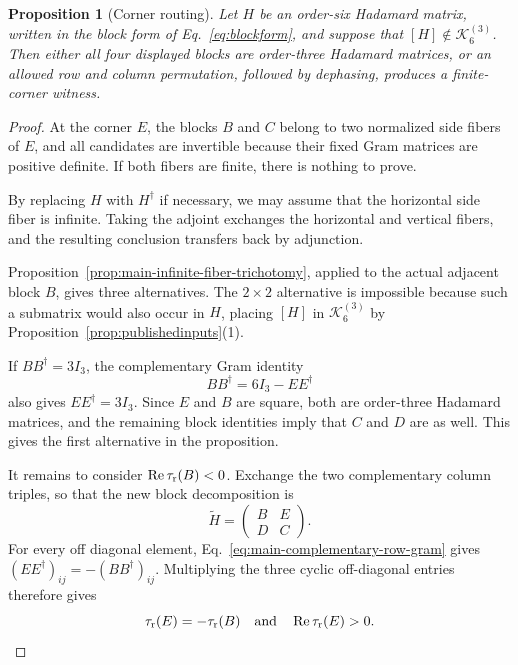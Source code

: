 \documentclass[aps,prx,reprint,nofootinbib,twoside,superscriptaddress,longbibliography,floatfix]{revtex4-2}
\newtheorem{proposition}[theorem]{Proposition}
\theoremstyle{definition}
\newcommand{\KK}{\mathcal K}
\newcommand{\RePart}{\operatorname{Re}}
\begin{document}
\begin{proposition}[Corner routing]
\label{prop:main-corner-routing}
Let $H$ be an order-six Hadamard matrix, written in the block form
of Eq.~\eqref{eq:blockform}, and suppose that
$[H]\notin\KK_6^{(3)}$. Then either all four displayed blocks are
order-three Hadamard matrices, or an allowed row and column permutation,
followed by dephasing, produces a finite-corner witness.
\end{proposition}

\begin{proof}
At the corner $E$, the blocks $B$ and $C$ belong to two normalized side fibers of $E$, and all candidates are invertible because their fixed Gram matrices are positive definite. If both fibers are finite, there is nothing to prove.

By replacing $H$ with $H^\dagger$ if necessary, we may assume that the horizontal side fiber is infinite.  Taking the adjoint exchanges the horizontal and vertical fibers, and the resulting conclusion transfers back by adjunction.

Proposition~\ref{prop:main-infinite-fiber-trichotomy}, applied to the actual adjacent block $B$, gives three alternatives. The $2\times2$ alternative is impossible because such a submatrix would also occur in $H$, placing $[H]$ in $\KK_6^{(3)}$ by Proposition~\ref{prop:publishedinputs}(1).

If $BB^\dagger=3I_3$, the complementary Gram identity
\begin{equation}
BB^\dagger=6I_3-EE^\dagger
\label{eq:main-complementary-row-gram}
\end{equation}
also gives $EE^\dagger=3I_3$. Since $E$ and $B$ are square, both are order-three Hadamard matrices, and the remaining block identities imply that $C$ and $D$ are as well. This gives the first alternative in the proposition.

It remains to consider $\RePart\tau_{\rm r}(B)<0$.
Exchange the two complementary column triples, so that the new block decomposition is
\begin{equation}
    \widetilde H=
    \begin{pmatrix}
    B&E\\
    D&C
    \end{pmatrix}.
\end{equation}
For every off diagonal element, Eq.~\eqref{eq:main-complementary-row-gram} gives $(EE^\dagger)_{ij}=-(BB^\dagger)_{ij}$.
Multiplying the three cyclic off-diagonal entries therefore gives
\begin{equation}
\tau_{\rm r}(E)=-\tau_{\rm r}(B)
\quad \text{and} \quad
\RePart\tau_{\rm r}(E)>0.
\label{eq:main-complementary-cubic-sign}
\end{equation}



\end{proof}
\end{document}
